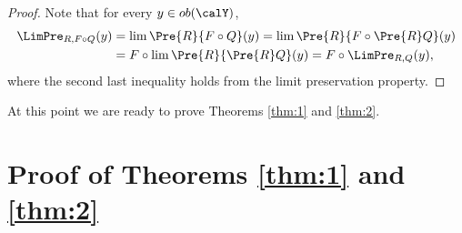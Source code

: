 \documentclass[12pt,oneside]{article}
\begin{document}
\begin{proof} Note that for every $y\in ob(\calY)$, 
	\[\begin{split}
		\LimPre_{R,F\circ Q} (y) &= \lim \Pre{R}{F\circ Q}(y) = \lim \Pre{R}{F\circ \Pre{R}Q}(y) \\
		& = F\circ \lim \Pre{R}{\Pre{R}Q}(y) = F\circ \LimPre_{R,Q} (y) ,
	\end{split}\]
	where the second last inequality holds from the limit preservation property.
\end{proof}

At this point we are ready to prove Theorems \ref{thm:1} and \ref{thm:2}.

\section{Proof of Theorems \ref{thm:1} and \ref{thm:2}} \label{sec:proof:2}
\end{document}
